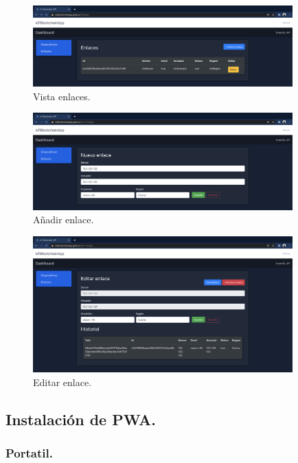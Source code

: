 \begin{figure}[ht!]
  \centering
  \includegraphics[width=10cm]{imagenes/desarrollo/web/vista_enlaces}
  \caption{Vista enlaces.}
  \label{fig:vista-enlace}
\end{figure}

\begin{figure}[ht!]
  \centering
  \includegraphics[width=10cm]{imagenes/desarrollo/web/aniadir_enlace}
  \caption{Añadir enlace.}
  \label{fig:aniadir-enlace}
\end{figure}

\begin{figure}[ht!]
  \centering
  \includegraphics[width=10cm]{imagenes/desarrollo/web/editar_enlace}
  \caption{Editar enlace.}
  \label{fig:editar-enlace}
\end{figure}

\subsection{Instalación de PWA.}

\subsubsection*{Portatil.}

